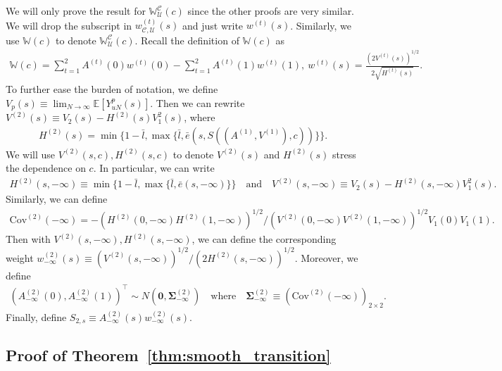 \documentclass[12pt]{article}
\newcommand{\E}{\mathbb E}								%
\begin{document}
We will only prove the result for $\mathbb{W}_{\mathcal{U}}^{\mathcal{C}}(c)$ since the other proofs are very similar. We will drop the subscript in $w_{\mathcal{C},\mathcal{U}}^{(t)}(s)$ and just write $w^{(t)}(s)$. Similarly, we use $\mathbb{W}(c)$ to denote $\mathbb{W}_{\mathcal{U}}^{\mathcal{C}}(c)$. Recall the definition of $\mathbb{W}(c)$ as 
\begin{align*}
	\mathbb{W}(c)=\sum_{t=1}^2 A^{(t)}(0) w^{(t)}(0) -\sum_{t=1}^2 A^{(t)}(1) w^{(t)}(1),\ w^{(t)}(s)=\frac{(2V^{(t)}(s))^{1/2}}{2\sqrt{H^{(t)}(s)}}.
\end{align*}
To further ease the burden of notation, we define $V_p(s)\equiv \lim_{N\rightarrow\infty}\E[Y_{uN}^p(s)]$. Then we can rewrite $V^{(2)}(s)\equiv V_2(s)-H^{(2)}(s)V_1^2(s)$, where 
\begin{align*}
	H^{(2)}(s)=\min\{1-\bar l,\max\{\bar l,\bar e(s,S((A^{(1)},V^{(1)}),c))\}\}.
\end{align*}
We will use $V^{(2)}(s,c),H^{(2)}(s,c)$ to denote $V^{(2)}(s)$ and $H^{(2)}(s)$ stress the dependence on $c$. In particular, we can write 
\small
\begin{align*}
	H^{(2)}(s,-\infty)\equiv \min\{1-\bar l,\max\{\bar l,\bar e(s,-\infty)\}\}\quad\text{and}\quad V^{(2)}(s,-\infty)\equiv V_2(s)-H^{(2)}(s,-\infty)V_1^2(s).
\end{align*}
\normalsize
Similarly, we can define 
\begin{align*}
	\mathrm{Cov}^{(2)}(-\infty)=-(H^{(2)}(0,-\infty)H^{(2)}(1,-\infty))^{1/2}/(V^{(2)}(0,-\infty)V^{(2)}(1,-\infty))^{1/2}V_1(0)V_1(1).
\end{align*}
Then with $V^{(2)}(s,-\infty),H^{(2)}(s,-\infty)$, we can define the corresponding weight $w_{-\infty}^{(2)}(s)\equiv (V^{(2)}(s,-\infty))^{1/2}/(2H^{(2)}(s,-\infty))^{1/2}$. Moreover, we define
\begin{align*}
	(A_{-\infty}^{(2)}(0),A_{-\infty}^{(2)}(1))^\top \sim N(\bm 0,\bm \Sigma^{(2)}_{-\infty})\quad\text{where}\quad \bm \Sigma^{(2)}_{-\infty}\equiv (\mathrm{Cov}^{(2)}(-\infty))_{2\times 2}.
\end{align*}
Finally, define $S_{2,s}\equiv A_{-\infty}^{(2)}(s) w_{-\infty}^{(2)}(s)$.

\subsection{Proof of Theorem~\ref{thm:smooth_transition}}
\end{document}
